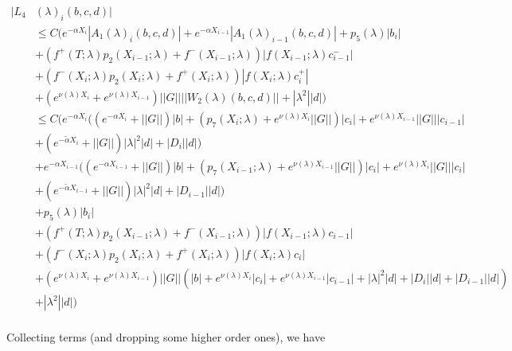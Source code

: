 \documentclass[12pt]{article}
\begin{document}
\begin{enumerate}
\begin{align*}
|L_4&(\lambda)_i(b, c, d)|\\ 
&\leq C \Big( e^{-\alpha X_i} |A_1(\lambda)_i(b, c, d)| +  e^{-\alpha X_{i-1}} |A_1(\lambda)_{i-1}(b, c, d)| + p_5(\lambda) |b_i| \\
&+ (f^+(T; \lambda) p_2(X_{i-1}; \lambda) + f^-(X_{i-1}; \lambda)) |f(X_{i-1}; \lambda) c_{i-1}^-| \\
&+ (f^-(X_i; \lambda) p_2(X_i; \lambda) + f^+(X_i; \lambda)) |f(X_i; \lambda) c_i^+| \\
&+ (e^{\nu(\lambda)X_i} + e^{\nu(\lambda)X_{i-1}}) ||G|| ||W_2(\lambda)(b,c,d)|| + |\lambda^2| |d| \Big) \\
&\leq C \Big( e^{-\alpha X_i} ( (e^{-\alpha X_i} + ||G||) |b| 
+ ( p_7(X_i; \lambda) + e^{\nu(\lambda)X_i} ||G||) |c_i| + e^{\nu(\lambda)X_{i-1}} ||G|| |c_{i-1}| \\
&+ (e^{-\tilde{\alpha} X_i} + ||G||) |\lambda|^2 |d| + |D_i||d| ) \\
&+ e^{-\alpha X_{i-1}} ( (e^{-\alpha X_{i-1}} + ||G||) |b| 
+ ( p_7(X_{i-1}; \lambda) + e^{\nu(\lambda)X_{i-1}} ||G||) |c_i| + e^{\nu(\lambda)X_i} ||G|| |c_i| \\
&+ (e^{-\tilde{\alpha} X_{i-1}} + ||G||) |\lambda|^2 |d| + |D_{i-1}||d| ) \\
&+ p_5(\lambda) |b_i| \\
&+ (f^+(T; \lambda) p_2(X_{i-1}; \lambda) + f^-(X_{i-1}; \lambda)) |f(X_{i-1}; \lambda) c_{i-1}| \\
&+ (f^-(X_i; \lambda) p_2(X_i; \lambda) + f^+(X_i; \lambda)) |f(X_i; \lambda) c_i| \\
&+ (e^{\nu(\lambda)X_i} + e^{\nu(\lambda)X_{i-1}}) ||G|| ( |b| + e^{\nu(\lambda)X_i} |c_i| + e^{\nu(\lambda)X_{i-1}} |c_{i-1}| 
+ |\lambda|^2 |d| + |D_i||d| + |D_{i-1}||d|)\\ 
&+ |\lambda^2| |d| \Big) \\
\end{align*}

Collecting terms (and dropping some higher order ones), we have


\end{enumerate}
\end{document}

